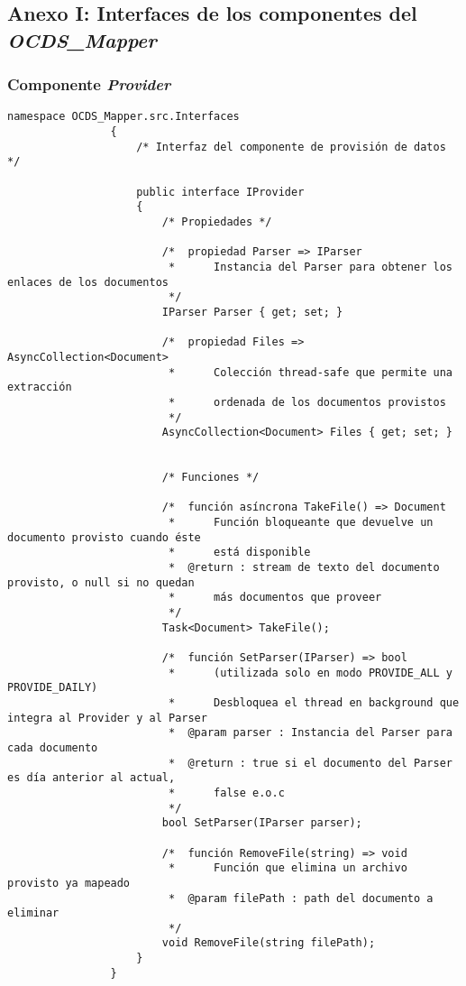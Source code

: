 
    \subsection{Anexo I: Interfaces de los componentes del \textit{OCDS\_Mapper}} \label{annex:interfaces}
        \subsubsection{Componente \textit{Provider}}
            \begin{lstlisting}[language=lCSharp]
                namespace OCDS_Mapper.src.Interfaces
                {
                    /* Interfaz del componente de provisión de datos */
                
                    public interface IProvider
                    {
                        /* Propiedades */
                
                        /*  propiedad Parser => IParser
                         *      Instancia del Parser para obtener los enlaces de los documentos
                         */
                        IParser Parser { get; set; }
                
                        /*  propiedad Files => AsyncCollection<Document>
                         *      Colección thread-safe que permite una extracción
                         *      ordenada de los documentos provistos
                         */
                        AsyncCollection<Document> Files { get; set; }
                
                
                        /* Funciones */
                
                        /*  función asíncrona TakeFile() => Document
                         *      Función bloqueante que devuelve un documento provisto cuando éste
                         *      está disponible
                         *  @return : stream de texto del documento provisto, o null si no quedan
                         *      más documentos que proveer
                         */
                        Task<Document> TakeFile();
                
                        /*  función SetParser(IParser) => bool
                         *      (utilizada solo en modo PROVIDE_ALL y PROVIDE_DAILY)
                         *      Desbloquea el thread en background que integra al Provider y al Parser
                         *  @param parser : Instancia del Parser para cada documento
                         *  @return : true si el documento del Parser es día anterior al actual,
                         *      false e.o.c
                         */
                        bool SetParser(IParser parser);
                
                        /*  función RemoveFile(string) => void
                         *      Función que elimina un archivo provisto ya mapeado
                         *  @param filePath : path del documento a eliminar
                         */
                        void RemoveFile(string filePath);
                    }
                }
            \end{lstlisting}
\newpage
